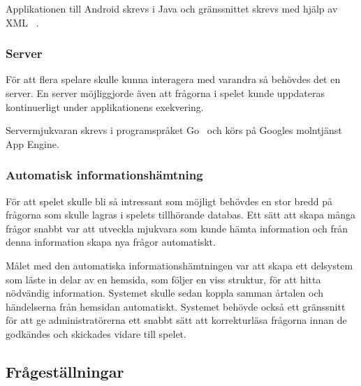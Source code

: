 \documentclass[a4paper, 11pt]{article}
\begin{document}
Applikationen till Android skrevs i Java och gränssnittet skrevs med hjälp av XML ~\cite{xml}. 

\subsubsection{Server}
För att flera spelare skulle kunna interagera med varandra så behövdes det en server. En server möjliggjorde även att frågorna i spelet kunde uppdateras kontinuerligt under applikationens exekvering.

Servermjukvaran skrevs i programspråket Go~\cite{golang} och körs på Googles molntjänst App Engine.

\subsubsection{Automatisk informationshämtning}
För att spelet skulle bli så intressant som möjligt behövdes en stor bredd på frågorna som skulle lagras i spelets tillhörande databas. Ett sätt att skapa många frågor snabbt var att utveckla mjukvara som kunde hämta information och från denna information skapa nya frågor automatiskt. 

Målet med den automatiska informationshämtningen var att skapa ett delsystem som läste in delar av en hemsida, som följer en viss struktur, för att hitta nödvändig information. Systemet skulle sedan koppla samman årtalen och händelserna från hemsidan automatiskt. Systemet behövde också ett gränssnitt för att ge administratörerna ett snabbt sätt att korrekturläsa frågorna innan de godkändes och skickades vidare till spelet.

\subsection{Frågeställningar}
\end{document}
